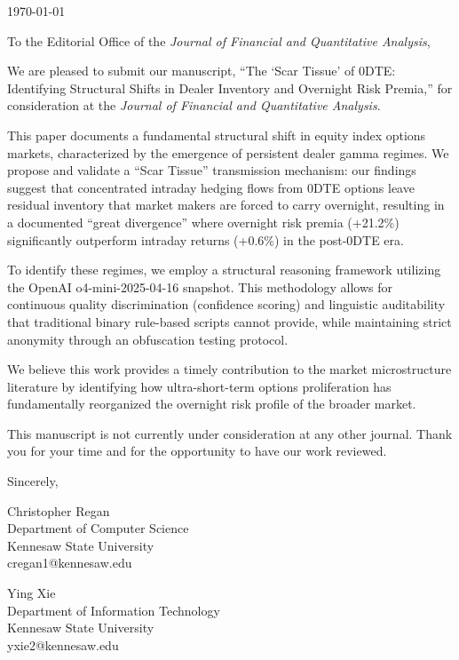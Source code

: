 \documentclass[12pt]{article}
\begin{document}
\noindent
\today

\vspace{1cm}

\noindent
To the Editorial Office of the \textit{Journal of Financial and Quantitative Analysis},

\vspace{0.5cm}

We are pleased to submit our manuscript, ``The `Scar Tissue' of 0DTE: Identifying Structural Shifts in Dealer Inventory and Overnight Risk Premia,'' for consideration at the \textit{Journal of Financial and Quantitative Analysis}.

This paper documents a fundamental structural shift in equity index options markets, characterized by the emergence of persistent dealer gamma regimes. We propose and validate a ``Scar Tissue'' transmission mechanism: our findings suggest that concentrated intraday hedging flows from 0DTE options leave residual inventory that market makers are forced to carry overnight, resulting in a documented ``great divergence'' where overnight risk premia (+21.2\%) significantly outperform intraday returns (+0.6\%) in the post-0DTE era.

To identify these regimes, we employ a structural reasoning framework utilizing the OpenAI o4-mini-2025-04-16 snapshot. This methodology allows for continuous quality discrimination (confidence scoring) and linguistic auditability that traditional binary rule-based scripts cannot provide, while maintaining strict anonymity through an obfuscation testing protocol.

We believe this work provides a timely contribution to the market microstructure literature by identifying how ultra-short-term options proliferation has fundamentally reorganized the overnight risk profile of the broader market.

This manuscript is not currently under consideration at any other journal. Thank you for your time and for the opportunity to have our work reviewed.

\vspace{1cm}

\noindent
Sincerely,

\vspace{1cm}

\noindent
Christopher Regan\\
Department of Computer Science\\
Kennesaw State University\\
cregan1@kennesaw.edu

\vspace{0.5cm}

\noindent
Ying Xie\\
Department of Information Technology\\
Kennesaw State University\\
yxie2@kennesaw.edu
\end{document}
